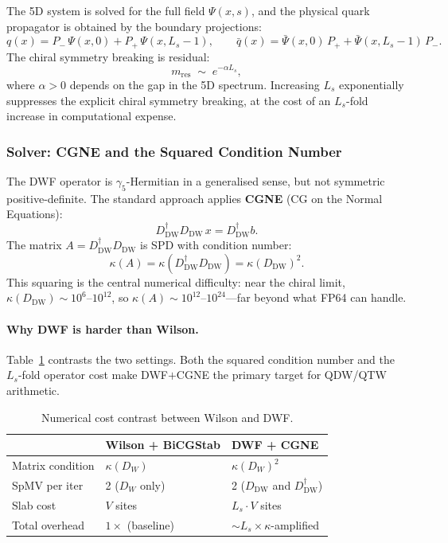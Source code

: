\documentclass[12pt,a4paper]{article}
\begin{document}
The 5D system is solved for the full field $\Psi(x,s)$, and the
physical quark propagator is obtained by the boundary projections:
\begin{equation}
  q(x) = P_-\,\Psi(x,0) + P_+\,\Psi(x,L_s-1),
  \qquad
  \bar{q}(x) = \bar\Psi(x,0)\,P_+ + \bar\Psi(x,L_s-1)\,P_-.
\end{equation}
The chiral symmetry breaking is residual:
\begin{equation}
  m_{\mathrm{res}} \;\sim\; e^{-\alpha L_s},
\end{equation}
where $\alpha > 0$ depends on the gap in the 5D spectrum.
Increasing $L_s$ exponentially suppresses the explicit chiral symmetry
breaking, at the cost of an $L_s$-fold increase in computational expense.

\subsubsection{Solver: CGNE and the Squared Condition Number}

The DWF operator is $\gamma_5$-Hermitian in a generalised sense, but not
symmetric positive-definite.
The standard approach applies \textbf{CGNE} (CG on the Normal Equations):
\begin{equation}
  D_{\mathrm{DW}}^\dagger D_{\mathrm{DW}}\, x = D_{\mathrm{DW}}^\dagger b.
  \label{eq:normal_eq}
\end{equation}
The matrix $A = D_{\mathrm{DW}}^\dagger D_{\mathrm{DW}}$ is SPD with condition number:
\begin{equation}
  \kappa(A) = \kappa(D_{\mathrm{DW}}^\dagger D_{\mathrm{DW}})
  = \kappa(D_{\mathrm{DW}})^2.
  \label{eq:kappa_squared}
\end{equation}
This squaring is the central numerical difficulty: near the chiral limit,
$\kappa(D_{\mathrm{DW}}) \sim 10^6$--$10^{12}$, so
$\kappa(A) \sim 10^{12}$--$10^{24}$---far beyond what FP64 can handle.

\paragraph{Why DWF is harder than Wilson.}
Table~\ref{tab:dwf_vs_wilson} contrasts the two settings. Both the squared
condition number and the $L_s$-fold operator cost make DWF$+$CGNE the primary
target for QDW/QTW arithmetic.

\begin{table}[H]
\centering
\caption{Numerical cost contrast between Wilson and DWF.}
\label{tab:dwf_vs_wilson}
\begin{tabular}{lll}
\toprule
 & \textbf{Wilson + BiCGStab} & \textbf{DWF + CGNE} \\
\midrule
Matrix condition & $\kappa(D_W)$ & $\kappa(D_W)^2$ \\
SpMV per iter   & 2 ($D_W$ only) & 2 ($D_{\mathrm{DW}}$ and $D_{\mathrm{DW}}^\dagger$) \\
Slab cost       & $V$ sites      & $L_s \cdot V$ sites \\
Total overhead  & $1\times$ (baseline) & $\sim L_s \times \kappa$-amplified \\
\bottomrule
\end{tabular}
\end{table}
\end{document}
